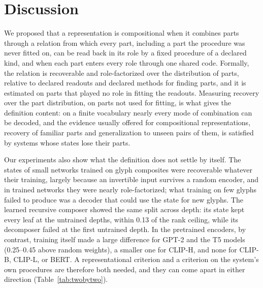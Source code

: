 \documentclass[10pt]{article}
\theoremstyle{plain}
\theoremstyle{remark}
\begin{document}
\section{Discussion}
\label{sec:discussion}

We proposed that a representation is compositional when it combines parts through a relation from which every part, including a part the procedure was never fitted on, can be read back in its role by a fixed procedure of a declared kind, and when each part enters every role through one shared code. Formally, the relation is recoverable and role-factorized over the distribution of parts, relative to declared readouts and declared methods for finding parts, and it is estimated on parts that played no role in fitting the readouts. Measuring recovery over the part distribution, on parts not used for fitting, is what gives the definition content: on a finite vocabulary nearly every mode of combination can be decoded, and the evidence usually offered for compositional representations, recovery of familiar parts and generalization to unseen pairs of them, is satisfied by systems whose states lose their parts.

Our experiments also show what the definition does not settle by itself. The states of small networks trained on glyph composites were recoverable whatever their training, largely because an invertible input survives a random encoder, and in trained networks they were nearly role-factorized; what training on few glyphs failed to produce was a decoder that could use the state for new glyphs. The learned recursive composer showed the same split across depth: its state kept every leaf at the untrained depths, within 0.13 of the rank ceiling, while its decomposer failed at the first untrained depth. In the pretrained encoders, by contrast, training itself made a large difference for GPT-2 and the T5 models (0.25--0.45 above random weights), a smaller one for CLIP-H, and none for CLIP-B, CLIP-L, or BERT. A representational criterion and a criterion on the system's own procedures are therefore both needed, and they can come apart in either direction (Table~\ref{tab:twobytwo}).
\end{document}
